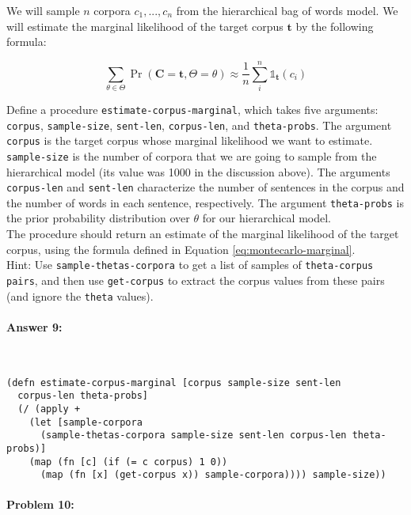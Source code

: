 \documentclass[12pt, letterpaper]{article}
\begin{document}
\noindent We will sample $n$ corpora $c_1,...,c_n$ from the hierarchical bag of
words model. We will estimate the marginal likelihood of the target
corpus $\mathbf{t}$ by the following formula:

\begin{equation}
\label{eq:montecarlo-marginal}
\sum_{\theta \in \Theta} \Pr(\mathbf{C}=\mathbf{t}, \Theta=\theta)  \approx \frac{1}{n} \sum_{i}^{n}\mathds{1}_{\mathbf{t}}(c_i) 
\end{equation}

\noindent Define a procedure \texttt{estimate-corpus-marginal}, which
takes five arguments: \texttt{corpus}, \texttt{sample-size},
\texttt{sent-len}, \texttt{corpus-len}, and \texttt{theta-probs}. The
argument \texttt{corpus} is the target corpus whose marginal
likelihood we want to estimate. \texttt{sample-size} is the number of
corpora that we are going to sample from the hierarchical model (its
value was 1000 in the discussion above). The arguments
\texttt{corpus-len} and \texttt{sent-len} characterize the number of
sentences in the corpus and the number of words in each sentence,
respectively. The argument \texttt{theta-probs} is the prior
probability distribution over $\theta$ for our hierarchical model.
\\

\noindent The procedure should return an estimate of the marginal
likelihood of the target corpus, using the formula defined in Equation
\ref{eq:montecarlo-marginal}.
\\

\noindent Hint: Use \texttt{sample-thetas-corpora} to get a list of
samples of \texttt{theta-corpus pairs}, and then use
\texttt{get-corpus} to extract the corpus values from these pairs (and
ignore the \texttt{theta} values).

\paragraph{Answer 9:}~\begin{lstlisting}
(defn estimate-corpus-marginal [corpus sample-size sent-len 
  corpus-len theta-probs]
  (/ (apply + 
    (let [sample-corpora 
      (sample-thetas-corpora sample-size sent-len corpus-len theta-probs)] 
    (map (fn [c] (if (= c corpus) 1 0)) 
      (map (fn [x] (get-corpus x)) sample-corpora)))) sample-size))
\end{lstlisting}

\hrulefill
\paragraph{Problem 10:}
\end{document}
